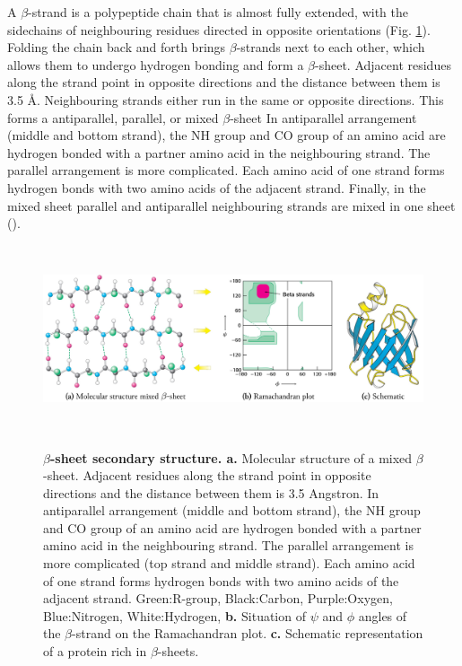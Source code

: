 A $\beta$-strand is a polypeptide chain that is almost fully extended, 
with the sidechains of neighbouring residues directed in opposite orientations (Fig. \ref{fig:sheet}). 
Folding the chain back and forth brings $\beta$-strands next to each other, 
which allows them to undergo hydrogen bonding and form a $\beta$-sheet.
Adjacent residues along the strand point in opposite directions and the distance between them is 3.5 Å. 
Neighbouring strands either run in the same or opposite directions. 
This forms a antiparallel, parallel, or mixed $\beta$-sheet
In antiparallel arrangement (middle and bottom strand),
the NH group and CO group of an amino acid are hydrogen bonded with a partner amino acid in the neighbouring strand.
The parallel arrangement is more complicated.
Each amino acid of one strand forms hydrogen bonds with two amino acids of the adjacent strand. 
Finally, in the mixed sheet parallel and antiparallel neighbouring strands are mixed in one sheet
(\cite{berg2015}).

~\begin{figure}[h!]
	\centering
	\includegraphics[width=\linewidth]{./literature_review/proteins/secundary_structure/sheet/img/sheet.png}
	\caption{
		\textbf{$\beta$-sheet secondary structure. a.}
	Molecular structure of a mixed $\beta$-sheet. 
	Adjacent residues along the strand point in opposite directions and the distance between them is 3.5 Angstron. 
	In antiparallel arrangement (middle and bottom strand),
	the NH group and CO group of an amino acid are hydrogen bonded with a partner amino acid in the neighbouring strand.
	The parallel arrangement is more complicated (top strand and middle strand). 
	Each amino acid of one strand forms hydrogen bonds with two amino acids of the adjacent strand. 
	Green:R-group, 
	Black:Carbon, 
	Purple:Oxygen, 
	Blue:Nitrogen,
	White:Hydrogen, 
		\textbf{b.}
	Situation of $\psi$ and $\phi$ angles of the $\beta$-strand on the Ramachandran plot.
		\textbf{c.}
	Schematic representation of a protein rich in $\beta$-sheets.
	}
	\label{fig:sheet}
~\end{figure}
